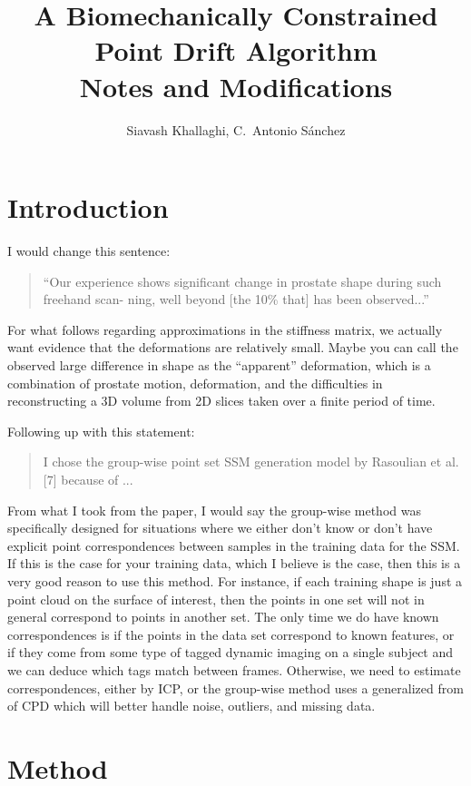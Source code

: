 \documentclass[10pt]{article}
\title{A Biomechanically Constrained Point Drift Algorithm \\ {\large Notes and Modifications}}
\author{Siavash Khallaghi, C.~Antonio S\'anchez}
\begin{document}
 
\maketitle

\section{Introduction}
I would change this sentence:
\begin{quotation}
  ``Our experience shows significant change in prostate shape during such freehand scan-
ning, well beyond [the 10\% that] has been observed...'' 
\end{quotation}
For what follows regarding approximations in the stiffness matrix, we actually want 
evidence that the deformations are relatively small.  Maybe you can call the observed large
difference in shape as the ``apparent'' deformation, which is a combination of prostate 
motion, deformation, and the difficulties in reconstructing a 3D volume from 2D slices
taken over a finite period of time.

Following up with this statement:
\begin{quotation}
  I chose the group-wise point set SSM generation model by Rasoulian et al. [7] because of
  ...
\end{quotation}
From what I took from the paper, I would say the group-wise method was specifically designed 
for situations where we either don't know or don't have explicit point correspondences between
samples in the training data for the SSM.  If this is the case for your training data, 
which I believe is the case, then this is a very good reason to use this method.
For instance, if each training shape is just a point cloud on the surface of interest, then 
the points in one set will not in general correspond to points in another set.  The only
time we do have known correspondences is if the points in the data set correspond to known
features, or if they come from some type of tagged dynamic imaging on a single subject and we can
deduce which tags match between frames.  Otherwise, we need to estimate correspondences, either
by ICP, or the group-wise method uses a generalized from of CPD which will better handle
noise, outliers, and missing data.


\section{Method}

\setcounter{subsection}{-1} %
\end{document}
